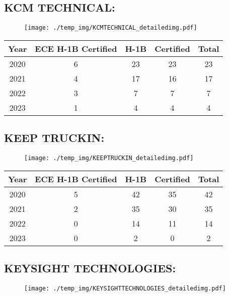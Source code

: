 \documentclass{article}%
\begin{document}
%
\newpage%
\subsection{KCM TECHNICAL:}%
\label{subsec:KCMTECHNICAL}%
\label{KCMTECHNICALdetailed}%


\begin{figure}[htbp]%
\centering%
\texttt{[image: ./temp\_img/KCMTECHNICAL\_detailedimg.pdf]}%
\end{figure}

%
\begin{longtable}{c|c|c|c|c}%
\hline%
Year&ECE H{-}1B Certified&H{-}1B&Certified&Total\\%
\hline%
2020&6&23&23&23\\%
\hline%
2021&4&17&16&17\\%
\hline%
2022&3&7&7&7\\%
\hline%
2023&1&4&4&4\\%
\hline%
\end{longtable}

%
\newpage%
\subsection{KEEP TRUCKIN:}%
\label{subsec:KEEPTRUCKIN}%
\label{KEEPTRUCKINdetailed}%


\begin{figure}[htbp]%
\centering%
\texttt{[image: ./temp\_img/KEEPTRUCKIN\_detailedimg.pdf]}%
\end{figure}

%
\begin{longtable}{c|c|c|c|c}%
\hline%
Year&ECE H{-}1B Certified&H{-}1B&Certified&Total\\%
\hline%
2020&5&42&35&42\\%
\hline%
2021&2&35&30&35\\%
\hline%
2022&0&14&11&14\\%
\hline%
2023&0&2&0&2\\%
\hline%
\end{longtable}

%
\newpage%
\subsection{KEYSIGHT TECHNOLOGIES:}%
\label{subsec:KEYSIGHTTECHNOLOGIES}%
\label{KEYSIGHTTECHNOLOGIESdetailed}%


\begin{figure}[htbp]%
\centering%
\texttt{[image: ./temp\_img/KEYSIGHTTECHNOLOGIES\_detailedimg.pdf]}%
\end{figure}
\end{document}
